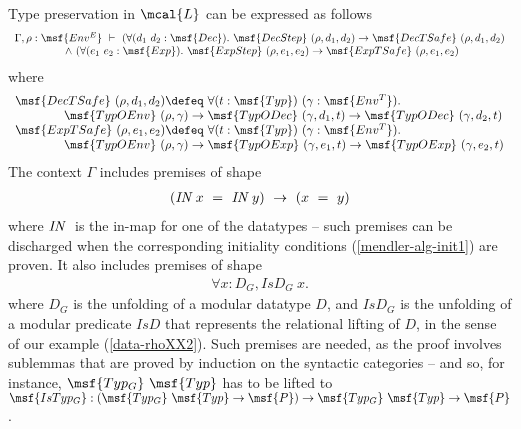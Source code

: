 \documentclass[submission,copyright,creativecommons]{eptcs}
\begin{document}
Type preservation in $\mcal{L}$ can be expressed as follows
\begin{gather}  \label{main}
\begin{array}{lll}
\Gamma, \rho: \msf{Env^E} \ \vdash \ 
(\forall (d_1 \ d_2: \msf{Dec}). \ \msf{DecStep} \ (\rho,d_1,
d_2) \to \msf{DecTSafe} \ (\rho, d_1,d_2) \\
\qquad \qquad \ \ \land \ (\forall (e_1 \ e_2:
\msf{Exp}). \ \msf{ExpStep} \ (\rho,e_1, e_2) \to
\msf{ExpTSafe} \ (\rho, e_1,e_2)
\end{array}
 \end{gather} 
where
\begin{gather} 
\begin{array}{lll}
\msf{DecTSafe} \ (\rho, d_1,d_2) \defeq \ \forall (t: \msf{Typ})
\ (\gamma:\msf{Env^T}). \\
\qquad \qquad \msf{TypOEnv} \ (\rho,\gamma) \to
\msf{TypODec} \ (\gamma,d_1, t) \to \msf{TypODec}
\ (\gamma, d_2, t) \\
\msf{ExpTSafe} \ (\rho, e_1,e_2) \defeq \ \forall (t: \msf{Typ})
\ (\gamma:\msf{Env^T}). \\
\qquad \qquad \msf{TypOEnv} \ (\rho,\gamma) \to
\msf{TypOExp} \ (\gamma,e_1, t) \to \msf{TypOExp}
\ (\gamma, e_2, t)
\end{array}
 \end{gather} 
The context $\Gamma$ includes premises of shape
\begin{gather}
 (\mbox{\it IN} \ x \ = \ \mbox{\it IN} \ y) \ \to \ (x \ = \ y)
\end{gather}
where $\mbox{\it IN} \ $ is the in-map for one of the datatypes --
such premises can be discharged when the corresponding initiality
conditions (\ref{mendler-alg-init1}) are proven. It also includes
premises of shape
\begin{gather}
\forall x:D_G, IsD_G \ x.
\end{gather}
where $D_G$ is the unfolding of a modular datatype $D$, and $IsD_G$ is
the unfolding of a modular predicate $IsD$ that represents the
relational lifting of $D$, in the sense of our example
(\ref{data-rhoXX2}). Such premises are needed, as the proof involves
sublemmas that are proved by induction on the syntactic categories --
and so, for instance, $\msf{Typ_G} \ \msf{Typ}$ has to be lifted to
$\msf{IsTyp_G}: (\msf{Typ_G} \ \msf{Typ} \to \msf{P}) \to \msf{Typ_G}
\ \msf{Typ} \to \msf{P}$.
\end{document}

